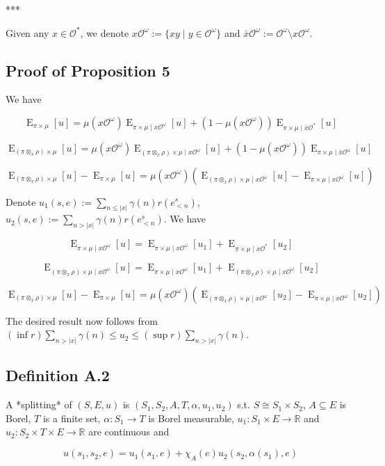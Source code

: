 \documentclass[a4paper]{article}
\DeclareMathOperator{\E}{E}
\newcommand{\Reals}{\mathbb{R}}
\newcommand{\Abs}[1]{\lvert #1 \rvert}
\newcommand{\Obs}{\mathcal{O}}
\newcommand{\ObsO}{\Obs^\omega}
\begin{document}
***

Given any ${x \in \Obs^*}$, we denote ${x\ObsO:=\{xy \mid y \in \ObsO\}}$ and ${\bar{x}\ObsO:=\ObsO \setminus x\ObsO}$.

\subsection{Proof of Proposition 5}

We have

$$\E_{\pi \times \mu}[u] = \mu(x\ObsO) \E_{\pi \times \mu \mid x \ObsO}[u] + (1 - \mu(x\ObsO)) \E_{\pi \times \mu \mid \bar{x} \Obs^*}[u]$$

$$\E_{(\pi \otimes_x \rho) \times \mu}[u] = \mu(x\ObsO) \E_{(\pi \otimes_x \rho) \times \mu \mid x \ObsO}[u] + (1 - \mu(x\ObsO)) \E_{\pi \times \mu \mid \bar{x} \ObsO}[u]$$

$$\E_{(\pi \otimes_x \rho) \times \mu}[u]-\E_{\pi \times \mu}[u] = \mu(x\ObsO)(\E_{(\pi \otimes_x \rho) \times \mu \mid x \ObsO}[u]-\E_{\pi \times \mu \mid x \ObsO}[u])$$

Denote ${u_1(s,e):=\sum_{n \leq \Abs{x}} \gamma(n) r(e^s_{<n})}$, ${u_2(s,e):=\sum_{n > \Abs{x}} \gamma(n) r(e^s_{<n})}$. We have

$$\E_{\pi \times \mu \mid x \ObsO}[u] = \E_{\pi \times \mu \mid x \ObsO}[u_1] + \E_{\pi \times \mu \mid x \Obs^*}[u_2]$$

$$\E_{(\pi \otimes_x \rho) \times \mu \mid x \ObsO}[u] = \E_{\pi \times \mu \mid x \ObsO}[u_1] + \E_{(\pi \otimes_x \rho) \times \mu \mid x \ObsO}[u_2]$$

$$\E_{(\pi \otimes_x \rho) \times \mu}[u]-\E_{\pi \times \mu}[u] = \mu(x\ObsO)(\E_{(\pi \otimes_x \rho) \times \mu \mid x \ObsO}[u_2]-\E_{\pi \times \mu \mid x \ObsO}[u_2])$$

The desired result now follows from ${(\inf r) \sum_{n > \Abs{x}} \gamma(n) \leq u_2 \leq (\sup r) \sum_{n > \Abs{x}} \gamma(n)}$.

\subsection{Definition A.2}

A *splitting* of ${(S,E,u)}$ is ${(S_1,S_2,A,T,\alpha,u_1,u_2)}$ s.t. ${S \cong S_1 \times S_2}$, ${A \subseteq E}$ is Borel, ${T}$ is a finite set, ${\alpha: S_1 \rightarrow T}$ is Borel measurable, ${u_1: S_1 \times E \rightarrow \Reals}$ and ${u_2: S_2 \times T \times E \rightarrow \Reals}$ are continuous and

$$u(s_1,s_2,e) = u_1(s_1,e) + \chi_A(e) u_2(s_2, \alpha(s_1), e)$$
\end{document}

